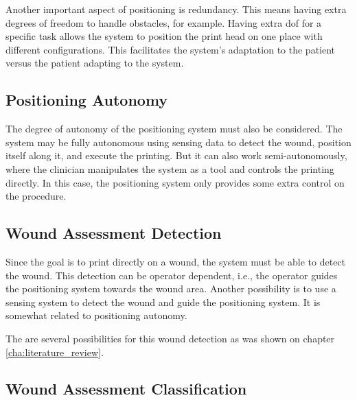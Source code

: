 Another important aspect of positioning is redundancy. This means having extra degrees of freedom to handle obstacles, for example. Having extra \gls{dof} for a specific task allows the system to position the print head on one place with different configurations. This facilitates the system's adaptation to the patient versus the patient adapting to the system.


\subsection{Positioning Autonomy}
\label{subsec:system_architecture_requirements_positioning_autonomy}

The degree of autonomy of the positioning system must also be considered. The system may be fully autonomous using sensing data to detect the wound, position itself along it, and execute the printing. But it can also work semi-autonomously, where the clinician manipulates the system as a tool and controls the printing directly. In this case, the positioning system only provides some extra control on the procedure.


\subsection{Wound Assessment Detection}
\label{subsec:system_architecture_requirements_wound_assessment_detection}

Since the goal is to print directly on a wound, the system must be able to detect the wound. This detection can be operator dependent, i.e., the operator guides the positioning system towards the wound area. Another possibility is to use a sensing system to detect the wound and guide the positioning system. It is somewhat related to positioning autonomy.

The are several possibilities for this wound detection as was shown on chapter \ref{cha:literature_review}.


\subsection{Wound Assessment Classification}
\label{subsec:system_architecture_requirements_wound_assessment_classification}

